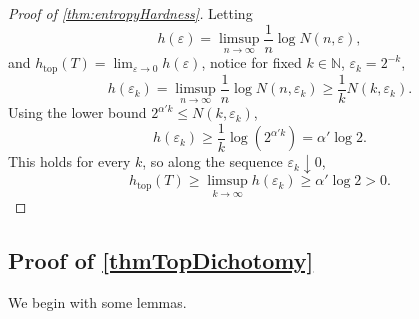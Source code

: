 \documentclass{amsart}
\theoremstyle{theorem}
\theoremstyle{remark}
\numberwithin{equation}{section}
\DeclareMathOperator{\Top}{top}
\newcommand{\NN}{\mathbb{N}}
\begin{document}
\begin{proof}[Proof of  \cref{thm:entropyHardness}]
Letting
\[
h(\varepsilon)=\limsup_{n\rightarrow \infty}\frac{1}{n} \log N(n,\varepsilon),
\]
and $h_{\Top}(T) = \lim_{\varepsilon\rightarrow 0}h(\varepsilon)$, notice for fixed $k \in \NN$, $\varepsilon_k = 2^{-k}$,
\[
h(\varepsilon_k)=\limsup_{n\rightarrow \infty}\frac{1}{n} \log N(n,\varepsilon_k) \geq \frac{1}{k}  N(k, \varepsilon_k).
\]
Using the lower bound $2^{\alpha' k} \leq N(k, \varepsilon_k)$,
\[
h(\varepsilon_k)\geq \frac{1}{k}\log(2^{\alpha' k}) = \alpha' \log 2.
\]
This holds for every $k$, so along the sequence $\varepsilon_k \downarrow 0$,
\[
h_{\text{top}}(T) \geq \limsup_{k\rightarrow\infty} h(\varepsilon_k)\geq \alpha' \log 2 > 0.
\]
\end{proof}



\subsection{Proof of \cref{thmTopDichotomy}}
We begin with some lemmas.
\end{document}

